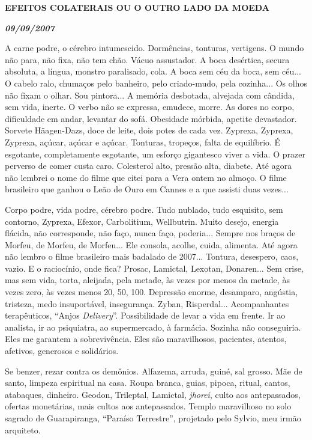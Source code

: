 
\textbf{EFEITOS COLATERAIS OU O OUTRO LADO DA MOEDA}

\textbf{\emph{09/09/2007}}

A carne podre, o cérebro intumescido. Dormências, tonturas, vertigens. O
mundo não para, não fixa, não tem chão. Vácuo assustador. A boca
desértica, secura absoluta, a língua, monstro paralisado, cola. A boca
sem céu da boca, sem céu... O cabelo ralo, chumaços pelo banheiro, pelo
criado-mudo, pela cozinha... Os olhos não fixam o olhar. Sou pintora...
A memória desbotada, alvejada com cândida, sem vida, inerte. O verbo não
se expressa, emudece, morre. As dores no corpo, dificuldade em andar,
levantar do sofá. Obesidade mórbida, apetite devastador. Sorvete
Häagen-Dazs, doce de leite, dois potes de cada vez. Zyprexa, Zyprexa,
Zyprexa, açúcar, açúcar e açúcar. Tonturas, tropeços, falta de
equilíbrio. É esgotante, completamente esgotante, um esforço gigantesco
viver a vida. O prazer perverso de comer custa caro. Colesterol alto,
pressão alta, diabete. Até agora não lembrei o nome do filme que citei
para a Vera ontem no almoço. O filme brasileiro que ganhou o Leão de
Ouro em Cannes e a que assisti duas vezes...

Corpo podre, vida podre, cérebro podre. Tudo nublado, tudo esquisito,
sem contorno, Zyprexa, Efexor, Carbolitium, Wellbutrin. Muito desejo,
energia flácida, não corresponde, não faço, nunca faço, poderia...
Sempre nos braços de Morfeu, de Morfeu, de Morfeu... Ele consola,
acolhe, cuida, alimenta. Até agora não lembro o filme brasileiro mais
badalado de 2007... Tontura, desespero, caos, vazio. E o raciocínio,
onde fica? Prosac, Lamictal, Lexotan, Donaren... Sem crise, mas sem
vida, torta, aleijada, pela metade, às vezes por menos da metade, às
vezes zero, às vezes menos 20, 50, 100. Depressão enorme, desamparo,
angústia, tristeza, medo insuportável, insegurança. Zyban, Risperdal...
Acompanhantes terapêuticos, ``Anjos \emph{Delivery}''. Possibilidade de
levar a vida em frente. Ir ao analista, ir ao psiquiatra, ao
supermercado, à farmácia. Sozinha não conseguiria. Eles me garantem a
sobrevivência. Eles são maravilhosos, pacientes, atentos, afetivos,
generosos e solidários.

Se benzer, rezar contra os demônios. Alfazema, arruda, guiné, sal
grosso. Mãe de santo, limpeza espiritual na casa. Roupa branca, guias,
pipoca, ritual, cantos, atabaques, dinheiro. Geodon, Trileptal,
Lamictal, \emph{jhorei}, culto aos antepassados, ofertas monetárias,
mais cultos aos antepassados. Templo maravilhoso no solo sagrado de
Guarapiranga, ``Paraíso Terrestre'', projetado pelo Sylvio, meu irmão
arquiteto.


